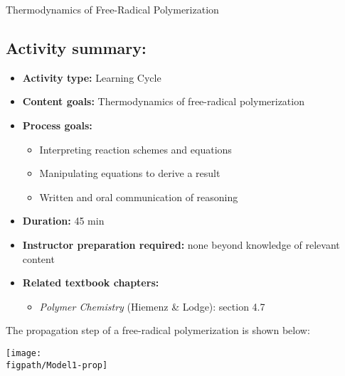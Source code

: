 \begin{activity}{Thermodynamics of Free-Radical Polymerization}
\begin{instructornotes}
	\subsection*{Activity summary:}
	\begin{itemize}
		\item \textbf{Activity type:} Learning Cycle
		\item \textbf{Content goals:} Thermodynamics of free-radical polymerization
		\item \textbf{Process goals:} %
			\begin{itemize}
				\item Interpreting reaction schemes and equations
				\item Manipulating equations to derive a result
				\item Written and oral communication of reasoning
			\end{itemize}
		\item \textbf{Duration:} 45 min
		\item \textbf{Instructor preparation required:} none beyond knowledge of relevant content
		\item \textbf{Related textbook chapters:}
			\begin{itemize}
				\item \emph{Polymer Chemistry} (Hiemenz \& Lodge): section 4.7
			\end{itemize}
	\end{itemize}
	
\end{instructornotes}


\begin{model}
	\label{\labelbase:mdl:propthermo}

	The propagation step of a free-radical polymerization is shown below:
	
	\centerline{\texttt{[image: \\figpath/Model1-prop]}}
	
	
\end{model}



\end{activity}
